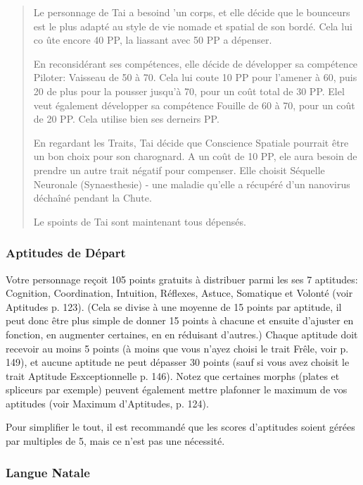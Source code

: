 \begin{quotation}
Le personnage de Tai a besoind 'un corps, et elle décide que le bounceurs est le plus adapté au style de vie nomade et spatial de son bordé. Cela lui co ûte encore 40 PP, la liassant avec 50 PP a dépenser. 

En reconsidérant ses compétences, elle décide de développer sa compétence Piloter: Vaisseau de 50 à 70. Cela lui coute 10 PP pour l'amener à 60, puis 20 de plus pour la pousser jusqu'à 70, pour un coût total de 30 PP. Elel veut également développer sa compétence Fouille de 60 à 70, pour un coût de 20 PP. Cela utilise bien ses derneirs PP. 

En regardant les Traits, Tai décide que Conscience Spatiale pourrait être un bon choix pour son charognard. A un coût de 10 PP, ele aura besoin de prendre un autre trait négatif pour compenser. Elle choisit Séquelle Neuronale (Synaesthesie) - une maladie qu'elle a récupéré d'un nanovirus déchaîné pendant la Chute. 

Le spoints de Tai sont maintenant tous dépensés. \end{quotation} 

\subsubsection{Aptitudes de Départ} \label{sec:starting-aptitudes} 

Votre personnage reçoit 105 points gratuits à distribuer parmi les ses 7 aptitudes: Cognition, Coordination, Intuition, Réflexes, Astuce, Somatique et Volonté (voir Aptitudes p. 123). (Cela se divise à une moyenne de 15 points par aptitude, il peut donc être plus simple de donner 15 points à chacune et ensuite d'ajuster en fonction, en augmenter certaines, en en réduisant d'autres.) Chaque aptitude doit recevoir au moins 5 points (à moins que vous n'ayez choisi le trait Frêle, voir p. 149), et aucune aptitude ne peut dépasser 30 points (sauf si vous avez choisit le trait Aptitude Esxceptionnelle p. 146). Notez que certaines morphs (plates et spliceurs par exemple) peuvent également mettre plafonner le maximum de vos aptitudes (voir Maximum d'Aptitudes, p. 124). 

Pour simplifier le tout, il est recommandé que les scores d'aptitudes soient gérées par multiples de 5, mais ce n'est pas une nécessité. 

\subsubsection{Langue Natale} \label{sec:native-tongue} 

